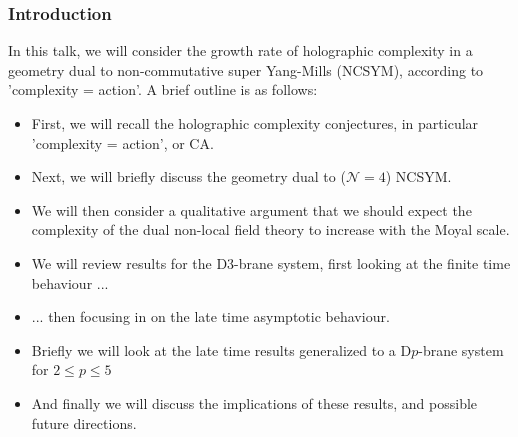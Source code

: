\documentclass[8pt,aspectratio=169]{beamer}
\begin{document}
\begin{frame}
\frametitle{Introduction}

In this talk, we will consider the growth rate of  holographic complexity in a geometry dual to non-commutative super Yang-Mills (NCSYM), according to 'complexity = action'. A brief outline is as follows:

\begin{itemize}

\item First, we will recall the holographic complexity conjectures, in particular 'complexity = action', or CA.

\item Next, we will briefly discuss the geometry dual to ($\mathcal{N} = 4$) NCSYM.

\item We will then consider a qualitative argument that we should expect the complexity of the dual non-local field theory to increase with the Moyal scale.

\item We will review results for the D3-brane system, first looking at the finite time behaviour ...

\item ... then focusing in on the late time asymptotic behaviour. 

\item Briefly we will look at the late time results generalized to a D$p$-brane system for $2\leq p \leq 5$

\item And finally we will discuss the implications of these results, and possible future directions.

\end{itemize}

\end{frame}
\end{document}
